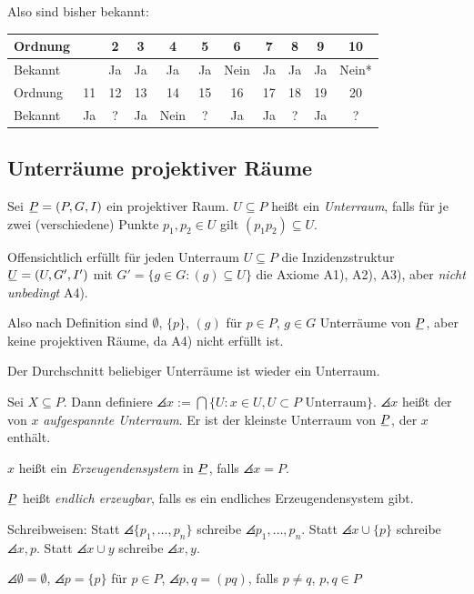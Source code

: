 Also sind bisher bekannt:
\begin{center}\begin{tabular}{l|c|c|c|c|c|c|c|c|c|c}
 Ordnung &    & 2  & 3  & 4  & 5  & 6    & 7  & 8  & 9  & 10 \\
 \hline
 Bekannt &    & Ja & Ja & Ja & Ja & Nein & Ja & Ja & Ja & Nein* \\[5pt]
 Ordnung & 11 & 12 & 13 & 14 & 15 & 16 & 17 & 18 & 19 & 20 \\
 \hline
 Bekannt & Ja & ?  & Ja & Nein & ? & Ja & Ja & ? & Ja & ?
\end{tabular}\end{center}

\subsection{Unterräume projektiver Räume}
\begin{defn*}
 Sei $\proj = (P,G,I)$ ein projektiver Raum. $U \subseteq P$ heißt ein \emph{Unterraum}, falls für je zwei (verschiedene) Punkte $p_1, p_2 \in U$ gilt $(p_1 p_2) \subseteq U$.
\end{defn*}

Offensichtlich erfüllt für jeden Unterraum $U \subseteq P$ die Inzidenzstruktur $\ubar{U} = (U,G',I')$ mit $G' = \{ g \in G : (g) \subseteq U \}$ die Axiome A1), A2), A3), aber \emph{nicht unbedingt} A4).

Also nach Definition sind $\emptyset$, $\{ p \}$, $(g)$ für $p \in P$, $g \in G$ Unterräume von $\proj$, aber keine projektiven Räume, da A4) nicht erfüllt ist. 

Der Durchschnitt beliebiger Unterräume ist wieder ein Unterraum.

\begin{defn*}
 Sei $X \subseteq P$. Dann definiere $\angles{x} := \bigcap \{ U : x \in U, U \subset P \text{ Unterraum} \}$. $\angles{x}$ heißt der von $x$ \emph{aufgespannte Unterraum}. Er ist der kleinste Unterraum von $\proj$, der $x$ enthält.
 
 $x$ heißt ein \emph{Erzeugendensystem} in $\proj$, falls $\angles{x} = P$.
 
 $\proj$ heißt \emph{endlich erzeugbar}, falls es ein endliches Erzeugendensystem gibt.
 
 Schreibweisen: Statt $\angles{ \{p_1, \ldots, p_n \} }$ schreibe $\angles{ p_1, \ldots, p_n }$. Statt $\angles{ x \cup \{p\} }$ schreibe $\angles{x,p}$. Statt $\angles{x \cup y}$ schreibe $\angles{x,y}$.
 
 $\angles{ \emptyset } = \emptyset$, $\angles{ p } = \{ p \}$ für $p \in P$, $\angles{ p,q } = ( pq )$, falls $p \ne q$, $p,q \in P$
\end{defn*}

